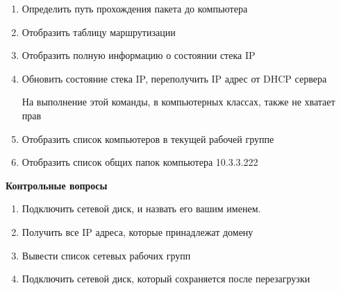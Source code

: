 \documentclass[a4paper,12pt]{article}
\begin{document}
\begin{flushleft}
\begin{enumerate} [1. ]
\begin{enumerate} [\bf a. ]
         Однако, при выполнении в компьютерных классах это задание может не сработать изза отсутсвия необходимых прав, в следствии чего возникнет системная ошибка
       
        \item Определить путь прохождения пакета до компьютера 

        \item Отобразить таблицу маршрутизации

        \item Отобразить полную информацию о состоянии стека IP

        \item Обновить состояние стека IP, переполучить IP адрес от DHCP сервера

         На выполнение этой команды, в компьютерных классах, также не хватает прав

        \item Отобразить список компьютеров в текущей рабочей группе

        \item Отобразить список общих папок компьютера 10.3.3.222

        \end{enumerate}
    \end{enumerate}

  \end{flushleft}

  \begin{center}
   {\bf Контрольные вопросы}
  \end{center}
  \begin{flushleft}
    \begin{enumerate}
     \item Подключить сетевой диск, и назвать его вашим именем.
     \item Получить все IP адреса, которые принадлежат домену 
     \item Вывести список сетевых рабочих групп
     \item Подключить сетевой диск, который сохраняется после перезагрузки
      
    \end{enumerate}

  \end{flushleft}
\end{document}
